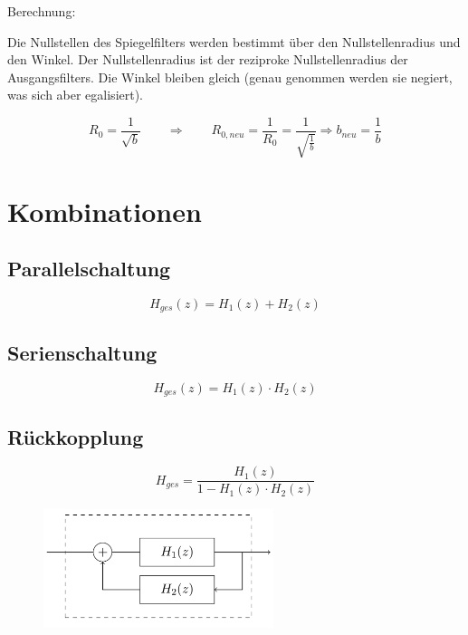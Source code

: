 \documentclass[a4paper, 12pt]{report}
\begin{document}
			\vspace{0.5cm}
			
			Berechnung:
			
			Die Nullstellen des Spiegelfilters werden bestimmt über den Nullstellenradius und den Winkel. Der Nullstellenradius ist der reziproke Nullstellenradius der Ausgangsfilters. Die Winkel bleiben gleich (genau genommen werden sie negiert, was sich aber egalisiert).
			
			\[ R_0 = \frac{1}{\sqrt{b}} \qquad \Longrightarrow \qquad R_{0,neu} = \frac{1}{R_0} = \frac{1}{\sqrt{\frac{1}{b}}} \Longrightarrow b_{neu} = \frac{1}{b} \]
			
\clearpage

	\section*{Kombinationen}
		\begin{minipage}[t]{0.5\textwidth}
			\subsection*{Parallelschaltung}
				\[ H_{ges}(z) = H_1(z) + H_2(z) \]
		\end{minipage}
		\begin{minipage}[t]{0.5\textwidth}
			\subsection*{Serienschaltung}
				\[ H_{ges}(z) = H_1(z) \cdot H_2(z) \]
		\end{minipage}
		
		\vspace{0.5cm}

		\begin{minipage}[t]{0.5\textwidth}
			\subsection*{Rückkopplung}
				\[ H_{ges} = \frac{H_1(z)}{1 - H_1(z) \cdot H_2(z)} \]
		\end{minipage}
		\begin{minipage}[t]{0.5\textwidth}
			\vspace{-0.3cm}
			\begin{figure}[H]
				\includegraphics[width=0.6\textwidth]{images/digitale_filter_rueckkopplung.png}
			\end{figure}
		\end{minipage}
		
\end{document}
